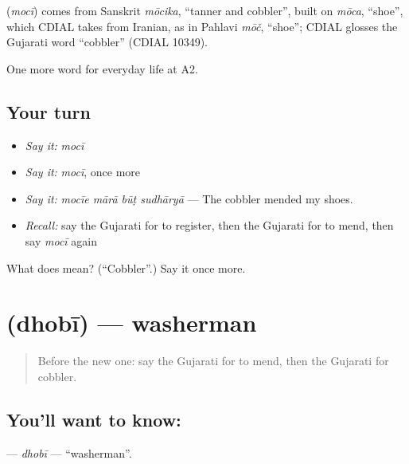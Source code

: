 \begin{cousinweb}
\textbf{} (\emph{mocī}) comes from Sanskrit \emph{mōcika}, \textquotedblleft{}tanner and cobbler\textquotedblright{}, built on \emph{mōca}, \textquotedblleft{}shoe\textquotedblright{}, which CDIAL takes from Iranian, as in Pahlavi \emph{mōč}, \textquotedblleft{}shoe\textquotedblright{}; CDIAL glosses the Gujarati word \textquotedblleft{}cobbler\textquotedblright{} (CDIAL 10349).
\end{cousinweb}

\begin{grammarlens}[title={What you've built}]
One more word for everyday life at A2.
\end{grammarlens}

\subsection*{Your turn}
\begin{itemize}
\raggedright
  \item \emph{Say it:} \emph{mocī}
  \item \emph{Say it:} \emph{mocī}, once more
  \item \emph{Say it:} \emph{mocīe mārā būṭ sudhāryā} — The cobbler mended my shoes.
  \item \emph{Recall:} say the Gujarati for to register, then the Gujarati for to mend, then say \emph{mocī} again
\end{itemize}

\begin{tcolorbox}[breakable,colback=teal!4,colframe=teal!35!black,title={Before you move on}]
What does  mean? (\textquotedblleft{}Cobbler\textquotedblright{}.) Say it once more.
\end{tcolorbox}
\section[\texorpdfstring{\gu{ધોબી} (dhobī)}{ધોબી (dhobī)}]{ (dhobī) — washerman}

\label{lesson:GU-C201-dhobi}



\begin{quote}
Before the new one: say the Gujarati for to mend, then the Gujarati for cobbler.
\end{quote}

\subsection*{You'll want to know: }
\textbf{} — \emph{dhobī} — \textquotedblleft{}washerman\textquotedblright{}.

